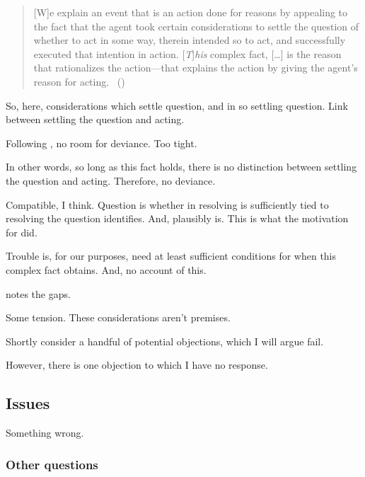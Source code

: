 \begin{note}
    \begin{quote}
      [W]e explain an event that is an action done for reasons by appealing to the fact that the agent took certain considerations to settle the question of whether to act in some way, therein intended so to act, and successfully executed that intention in action.
    [\emph{T}]\emph{his} complex fact, [\dots] is the reason that rationalizes the action---that explains the action by giving the agent’s reason for acting.%
    \mbox{ }\hfill\mbox{(\citeyear[431]{Hieronymi:2011aa})}
  \end{quote}

  So, here, considerations which settle question, and in so settling question.
  Link between settling the question and acting.

  Following \citeauthor{Hieronymi:2011aa}, no room for deviance.
  Too tight.

  In other words, so long as this fact holds, there is no distinction between settling the question and acting.
  Therefore, no deviance.

  Compatible, I think.
  Question is whether in resolving \qzS{} is sufficiently tied to resolving the question \citeauthor{Hieronymi:2011aa} identifies.
  And, plausibly is.
  This is what the motivation for \qzS{} did.

  Trouble is, for our purposes, need at least sufficient conditions for when this complex fact obtains.
  And, no account of this.

  \citeauthor{Hieronymi:2011aa} notes the gaps.

  Some tension.
  These considerations aren't premises.
\end{note}

\begin{note}
  Shortly consider a handful of potential objections, which I will argue fail.

  However, there is one objection to which I have no response.
\end{note}

\subsection{Issues}
\label{sec:issues}

\begin{note}
  Something wrong.
\end{note}

\subsubsection{Other questions}
\label{sec:other-questions}


